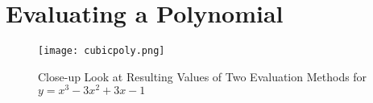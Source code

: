 \section{Evaluating a Polynomial}



\begin{figure}[h]
  \texttt{[image: cubicpoly.png]}\\
  \caption{Close-up Look at Resulting Values of Two Evaluation Methods for $y=x^3-3x^2+3x-1$}\label{f-polyeval}
\end{figure}
